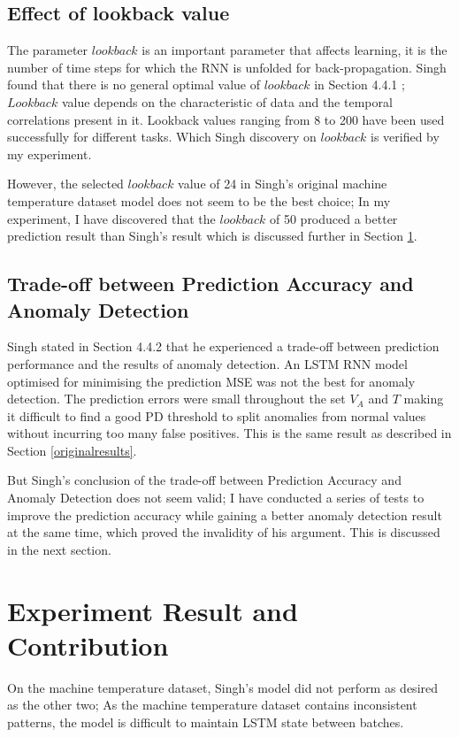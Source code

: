 \documentclass{article}
\begin{document}
\subsection{Effect of lookback value}
\label{lookbackeffect}
The parameter $lookback$ is an important parameter that
affects learning, it is the number of time steps for which the RNN is
unfolded for back-propagation. Singh found that there is no
general optimal value of $lookback$ in Section 4.4.1 \cite{7-lstmthisis};
$Lookback$ value depends on the characteristic of data and the temporal
correlations present in it. Lookback values ranging from 8 to 200 have been
used successfully for different tasks. Which Singh discovery on $lookback$ is
verified by my experiment. 

However, the selected $lookback$ value of 24 in Singh's original machine
temperature dataset model does not seem to be the best choice; In my
experiment, I have discovered that the $lookback$ of 50 produced a better
prediction result than Singh's result which is discussed further in Section
\ref{experiment}.

\subsection{Trade-off between Prediction Accuracy and Anomaly Detection}
\label{tradeoff}
Singh stated in Section 4.4.2 \cite{7-lstmthisis} that he experienced a
trade-off between prediction performance and the results of anomaly detection.
An LSTM RNN model optimised for minimising the prediction MSE was not the best
for anomaly detection. The prediction errors were small throughout the set
$V_A$ and $T$ making it difficult to find a good PD threshold to split
anomalies from normal values without incurring too many false positives.
This is the same result as described in Section \ref{originalresults}.

But Singh's conclusion of the trade-off between Prediction
Accuracy and Anomaly Detection does not seem valid; I have conducted a series
of tests to improve the prediction accuracy while gaining a better anomaly
detection result at the same time, which proved the invalidity of his argument.
This is discussed in the next section.


\section{Experiment Result and Contribution}
\label{experiment}

On the machine temperature dataset, Singh's model did not perform as desired as
the other two; As the machine temperature dataset contains inconsistent
patterns, the model is difficult to maintain LSTM state between batches. 
\end{document}
